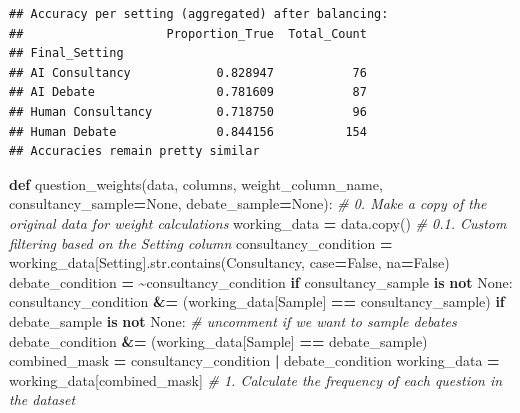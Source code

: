 \documentclass[
]{article}
\newenvironment{Shaded}{\begin{snugshade}}{\end{snugshade}}
\newcommand{\BuiltInTok}[1]{#1}
\newcommand{\CommentTok}[1]{\textcolor[rgb]{0.56,0.35,0.01}{\textit{#1}}}
\newcommand{\ControlFlowTok}[1]{\textcolor[rgb]{0.13,0.29,0.53}{\textbf{#1}}}
\newcommand{\KeywordTok}[1]{\textcolor[rgb]{0.13,0.29,0.53}{\textbf{#1}}}
\newcommand{\NormalTok}[1]{#1}
\newcommand{\OperatorTok}[1]{\textcolor[rgb]{0.81,0.36,0.00}{\textbf{#1}}}
\newcommand{\StringTok}[1]{\textcolor[rgb]{0.31,0.60,0.02}{#1}}
\newcommand{\VariableTok}[1]{\textcolor[rgb]{0.00,0.00,0.00}{#1}}
\begin{document}
\begin{verbatim}
## Accuracy per setting (aggregated) after balancing:
##                    Proportion_True  Total_Count
## Final_Setting                                  
## AI Consultancy            0.828947           76
## AI Debate                 0.781609           87
## Human Consultancy         0.718750           96
## Human Debate              0.844156          154
## Accuracies remain pretty similar
\end{verbatim}

\begin{Shaded}
\begin{Highlighting}[]


\KeywordTok{def}\NormalTok{ question\_weights(data, columns, weight\_column\_name, consultancy\_sample}\OperatorTok{=}\VariableTok{None}\NormalTok{, debate\_sample}\OperatorTok{=}\VariableTok{None}\NormalTok{):}
    \CommentTok{\# 0. Make a copy of the original data for weight calculations}
\NormalTok{    working\_data }\OperatorTok{=}\NormalTok{ data.copy()}
    \CommentTok{\# 0.1. Custom filtering based on the \textquotesingle{}Setting\textquotesingle{} column}
\NormalTok{    consultancy\_condition }\OperatorTok{=}\NormalTok{ working\_data[}\StringTok{\textquotesingle{}Setting\textquotesingle{}}\NormalTok{].}\BuiltInTok{str}\NormalTok{.contains(}\StringTok{\textquotesingle{}Consultancy\textquotesingle{}}\NormalTok{, case}\OperatorTok{=}\VariableTok{False}\NormalTok{, na}\OperatorTok{=}\VariableTok{False}\NormalTok{)}
\NormalTok{    debate\_condition }\OperatorTok{=} \OperatorTok{\textasciitilde{}}\NormalTok{consultancy\_condition}
    \ControlFlowTok{if}\NormalTok{ consultancy\_sample }\KeywordTok{is} \KeywordTok{not} \VariableTok{None}\NormalTok{:}
\NormalTok{        consultancy\_condition }\OperatorTok{\&=}\NormalTok{ (working\_data[}\StringTok{\textquotesingle{}Sample\textquotesingle{}}\NormalTok{] }\OperatorTok{==}\NormalTok{ consultancy\_sample)}
    \ControlFlowTok{if}\NormalTok{ debate\_sample }\KeywordTok{is} \KeywordTok{not} \VariableTok{None}\NormalTok{: }\CommentTok{\# uncomment if we want to sample debates}
\NormalTok{        debate\_condition }\OperatorTok{\&=}\NormalTok{ (working\_data[}\StringTok{\textquotesingle{}Sample\textquotesingle{}}\NormalTok{] }\OperatorTok{==}\NormalTok{ debate\_sample)}
\NormalTok{    combined\_mask }\OperatorTok{=}\NormalTok{ consultancy\_condition }\OperatorTok{|}\NormalTok{ debate\_condition}
\NormalTok{    working\_data }\OperatorTok{=}\NormalTok{ working\_data[combined\_mask]}
    \CommentTok{\# 1. Calculate the frequency of each question in the dataset}

\end{Highlighting}
\end{Shaded}
\end{document}
